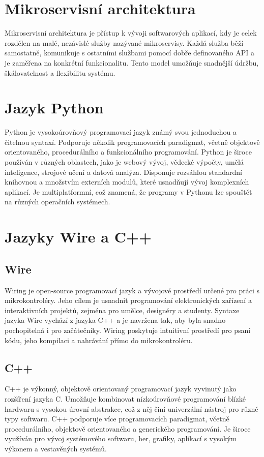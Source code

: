 \section{Mikroservisní architektura}\label{sec:microservice-architecture}
Mikroservisní architektura je přístup k vývoji softwarových aplikací, kdy je celek rozdělen na malé, nezávislé služby nazývané mikroservisy.
Každá služba běží samostatně, komunikuje s ostatními službami pomocí dobře definovaného API a je zaměřena na konkrétní funkcionalitu.
Tento model umožňuje snadnější údržbu, škálovatelnost a flexibilitu systému.


\section{Jazyk Python}\label{sec:python}
Python je vysokoúrovňový programovací jazyk známý svou jednoduchou a čitelnou syntaxí.
Podporuje několik programovacích paradigmat, včetně objektově orientovaného, procedurálního a funkcionálního programování.
Python je široce používán v různých oblastech, jako je webový vývoj, vědecké výpočty, umělá inteligence, strojové učení a datová analýza.
Disponuje rozsáhlou standardní knihovnou a množstvím externích modulů, které usnadňují vývoj komplexních aplikací.
Je multiplatformní, což znamená, že programy v Pythonu lze spouštět na různých operačních systémech.


\section{Jazyky Wire a C++ }

\subsection{Wire}\label{sec:wiring}
Wiring je open-source programovací jazyk a vývojové prostředí určené pro práci s mikrokontroléry.
Jeho cílem je usnadnit programování elektronických zařízení a interaktivních projektů, zejména pro umělce, designéry a studenty.
Syntaxe jazyka Wire vychází z jazyka C++ a je navržena tak, aby byla snadno pochopitelná i pro začátečníky.
Wiring poskytuje intuitivní prostředí pro psaní kódu, jeho kompilaci a nahrávání přímo do mikrokontroléru.

\subsection{C++}\label{sec:cpp}
C++ je výkonný, objektově orientovaný programovací jazyk vyvinutý jako rozšíření jazyka C.
Umožňuje kombinovat nízkoúrovňové programování blízké hardwaru s vysokou úrovní abstrakce, což z něj činí univerzální nástroj pro různé typy softwaru.
C++ podporuje více programovacích paradigmat, včetně procedurálního, objektově orientovaného a generického programování.
Je široce využíván pro vývoj systémového softwaru, her, grafiky, aplikací s vysokým výkonem a vestavěných systémů.


